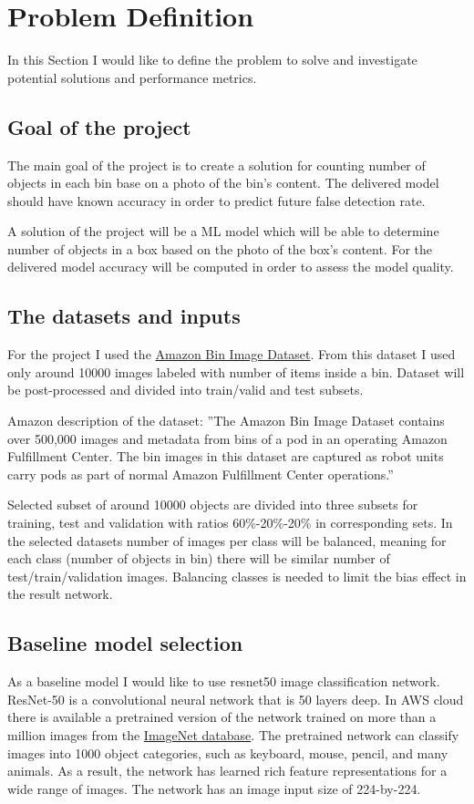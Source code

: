 \documentclass{article}
\begin{document}
\section{Problem Definition}
In this Section I would like to define the problem to solve and investigate potential solutions and performance metrics.

\subsection{Goal of the project}
The main goal of the project is to create a solution for counting number of objects in each bin base on a photo of the bin’s content. The delivered model should have known accuracy in order to predict future false detection rate.

A solution of the project will be a ML model which will be able to determine number of objects in a box based on the photo of the box's content. For the delivered model accuracy will be computed in order to assess the model quality.

\subsection{The datasets and inputs}
For the project I used the \href{https://registry.opendata.aws/amazon-bin-imagery/}{Amazon Bin Image Dataset}. From this dataset I used only around 10000 images labeled with number of items inside a bin. Dataset will be post-processed and divided into train/valid and test subsets.

Amazon description of the dataset: ''The Amazon Bin Image Dataset contains over 500,000 images and metadata from bins of a pod in an operating Amazon Fulfillment Center. The bin images in this dataset are captured as robot units carry pods as part of normal Amazon Fulfillment Center operations.''

Selected subset of around 10000 objects are divided into three subsets for training, test and validation with ratios 60\%-20\%-20\% in corresponding sets. In the selected datasets number of images per class will be balanced, meaning for each class (number of objects in bin) there will be similar number of test/train/validation images. Balancing classes is needed to limit the bias effect in the result network.

\subsection{Baseline model selection}
As a baseline model I would like to use resnet50 image classification network. ResNet-50 is a convolutional neural network that is 50 layers deep. In AWS cloud there is available a pretrained version of the network trained on more than a million images from the \href{http://www.image-net.org}{ImageNet database}. The pretrained network can classify images into 1000 object categories, such as keyboard, mouse, pencil, and many animals. As a result, the network has learned rich feature representations for a wide range of images. The network has an image input size of 224-by-224.
\end{document}
